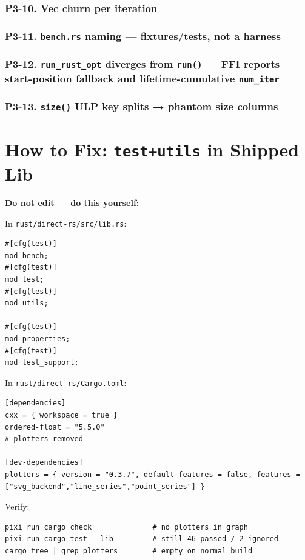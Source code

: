 \documentclass[11pt]{article}
\begin{document}
\subsubsection{P3-10. Vec churn per iteration}
\label{sec:org4efee39}
\subsubsection{P3-11. \texttt{bench.rs} naming — fixtures/tests, not a harness}
\label{sec:org0c9c85e}
\subsubsection{P3-12. \texttt{run\_rust\_opt} diverges from \texttt{run()} — FFI reports start-position fallback and lifetime-cumulative \texttt{num\_iter}}
\label{sec:org4ab5f74}
\subsubsection{P3-13. \texttt{size()} ULP key splits → phantom size columns}
\label{sec:org9998e8d}
\section{How to Fix: \texttt{test+utils} in Shipped Lib}
\label{sec:org970bf5f}
\textbf{Do not edit — do this yourself:}

In \texttt{rust/direct-rs/src/lib.rs}:

\begin{verbatim}
#[cfg(test)]
mod bench;
#[cfg(test)]
mod test;
#[cfg(test)]
mod utils;

#[cfg(test)]
mod properties;
#[cfg(test)]
mod test_support;
\end{verbatim}

In \texttt{rust/direct-rs/Cargo.toml}:

\begin{verbatim}
[dependencies]
cxx = { workspace = true }
ordered-float = "5.5.0"
# plotters removed

[dev-dependencies]
plotters = { version = "0.3.7", default-features = false, features = ["svg_backend","line_series","point_series"] }
\end{verbatim}

Verify:

\begin{verbatim}
pixi run cargo check              # no plotters in graph
pixi run cargo test --lib         # still 46 passed / 2 ignored
cargo tree | grep plotters        # empty on normal build
\end{verbatim}
\end{document}
